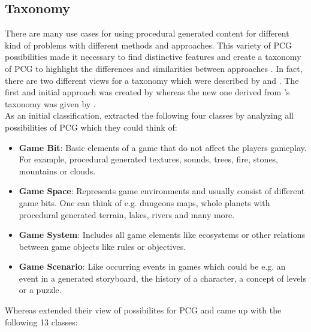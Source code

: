 \documentclass[MGS,Master,english]{twbook}%
\begin{document}
\subsection{Taxonomy}\label{PcgTaxonomy}
There are many use cases for using procedural generated content for different kind of problems with different methods and approaches. This variety of PCG possibilities made it necessary to find distinctive features and create a taxonomy of PCG to highlight the differences and similarities between approaches \cite{pcg::book}. In fact, there are two different views for a taxonomy which were described by \cite{pcg::survey} and \cite{pcg::book}. The first and initial approach was created by \cite{pcg::survey} whereas the new one derived from \cite{pcg::survey}'s taxonomy was given by \cite{pcg::book}.\\
As an initial classification, \cite{pcg::survey} extracted the following four classes by analyzing all possibilities of PCG which they could think of:
\begin{itemize}
	\item \textbf{Game Bit}: Basic elements of a game that do not affect the players gameplay. For example, procedural generated textures, sounds, trees, fire, stones, mountains or clouds. \cite{pcg::survey}
	\item \textbf{Game Space}: Represents game environments and usually consist of different game bits. One can think of e.g. dungeons maps, whole planets with procedural generated terrain, lakes, rivers and many more. \cite{pcg::survey}
	\item \textbf{Game System}: Includes all game elements like ecosystems or other relations between game objects like rules or objectives. \cite{pcg::survey}
	\item \textbf{Game Scenario}: Like occurring events in games which could be e.g. an event in a generated storyboard, the history of a character, a concept of levels or a puzzle. \cite{pcg::survey}
\end{itemize}
Whereas \cite{pcg::book} extended their view of possibilites for PCG and came up with the following 13 classes:
\end{document}
